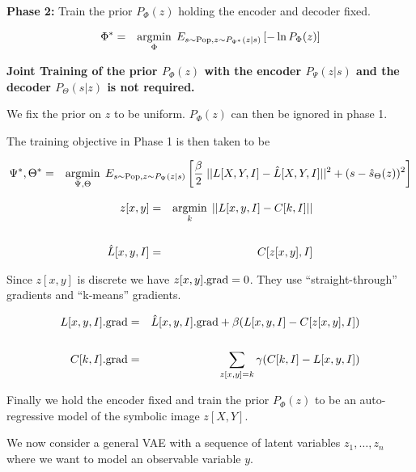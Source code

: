 {{\vfill
{\bf Phase 2:} Train the prior $P_\Phi(z)$ holding the encoder and decoder fixed.

\begin{eqnarray*}
\Phi^* &  = & \operatorname*{argmin}_{\Phi}\;E_{s\sim \mathrm{Pop},z\sim P_{\Psi^*}(z|s)}\left[-\ln P_\Phi(z)\right]
\end{eqnarray*}

\vfill
{\bf Joint Training of the prior $P_\Phi(z)$ with the encoder $P_\Psi(z|s)$ and the decoder $P_\Theta(s|z)$ is not required.}

}



We fix the prior on $z$ to be uniform.  $P_\Phi(z)$ can then be ignored in phase 1.

\vfill
The training objective in Phase 1 is then taken to be

\vfill
{\huge
\begin{eqnarray*}
\Psi^*,\Theta^* & = & \operatorname*{argmin}_{\Psi,\Theta} \;E_{s\sim \mathrm{Pop},z\sim P_\Psi(z|s)}\left[ \frac{\beta}{2}\;||L[X,Y,I] - \hat{L}[X,Y,I]||^2 + (s-\hat{s}_\Theta(z))^2\right]
\end{eqnarray*}
}



{\huge
\begin{eqnarray*}
z[x,y] & = & \operatorname*{argmin}_k \;||L[x,y,I] - C[k,I]|| \\
\\
\hat{L}[x,y,I] & = & C[z[x,y],I]
\end{eqnarray*}
}

Since $z[x,y]$ is discrete we have $z[x,y].\mathrm{grad} = 0$.
They use ``straight-through'' gradients and ``k-means'' gradients.

{\huge
\begin{eqnarray*}
L[x,y,I].\mathrm{grad} & = & \hat{L}[x,y,I].\mathrm{grad} + \beta(L[x,y,I] - C[z[x,y],I]) \\
\\
C[k,I].\mathrm{grad} & = & \sum_{z[x,y]=k} \gamma(C[k,I] - L[x,y,I])
\end{eqnarray*}
}


Finally we hold the encoder fixed and train the prior $P_\Phi(z)$ to be an auto-regressive model of the symbolic image $z[X,Y]$.


We now consider a general VAE with a sequence of latent variables $z_1,\dots,z_n$ where we want to model an observable variable $y$.

}
